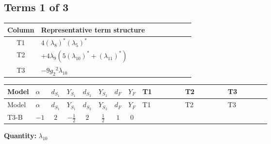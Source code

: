\documentclass[8pt]{article}
\begin{document}
\begin{landscape}
\subsection*{Terms 1 of 3}
\begin{center}
\begin{tabular}{@{}c >{\raggedright\arraybackslash}p{0.82\linewidth}@{}}
\toprule
Column & Representative term structure \\
\midrule
T1 & \(\displaystyle 4 \left({\lambda_8}\right)^{*} \left({\lambda_5}\right)^{*}\) \\
\midrule
T2 & \(\displaystyle +4 {\lambda_9} (5 \left({\lambda_{10}}\right)^{*}+\left({\lambda_{11}}\right)^{*})\) \\
\midrule
T3 & \(\displaystyle -9 {g_2}^2 {\lambda_{10}}\) \\
\midrule
\bottomrule
\end{tabular}
\end{center}
\smallskip
\tiny
\begin{longtable}{@{}llcccccc >{\raggedright\arraybackslash}p{0.21\linewidth} >{\raggedright\arraybackslash}p{0.21\linewidth} >{\raggedright\arraybackslash}p{0.21\linewidth}@{}}
\toprule
Model & $\alpha$ & $d_{S_1}$ & $Y_{S_1}$ & $d_{S_2}$ & $Y_{S_2}$ & $d_F$ & $Y_F$ & T1 & T2 & T3 \\
\midrule
\endfirsthead
\toprule
Model & $\alpha$ & $d_{S_1}$ & $Y_{S_1}$ & $d_{S_2}$ & $Y_{S_2}$ & $d_F$ & $Y_F$ & T1 & T2 & T3 \\
\midrule
\endhead
T3-B & $-1$ & $2$ & $-\frac{1}{2}$ & $2$ & $\frac{1}{2}$ & $1$ & $0$ & \scriptsize\adjustbox{max width=\linewidth}{$\begin{gathered} 4 \left({\lambda_8}\right)^{*} \left({\lambda_5}\right)^{*}\end{gathered}$} & \scriptsize\adjustbox{max width=\linewidth}{$\begin{gathered} +4 {\lambda_9} (5 \left({\lambda_{10}}\right)^{*}+\left({\lambda_{11}}\right)^{*})\end{gathered}$} & \scriptsize\adjustbox{max width=\linewidth}{$\begin{gathered} -9 {g_2}^2 {\lambda_{10}}\end{gathered}$} \\
\midrule
\bottomrule
\end{longtable}
\clearpage
\noindent\textbf{Quantity: }$\lambda_{10}$\par\smallskip

\end{landscape}
\end{document}
